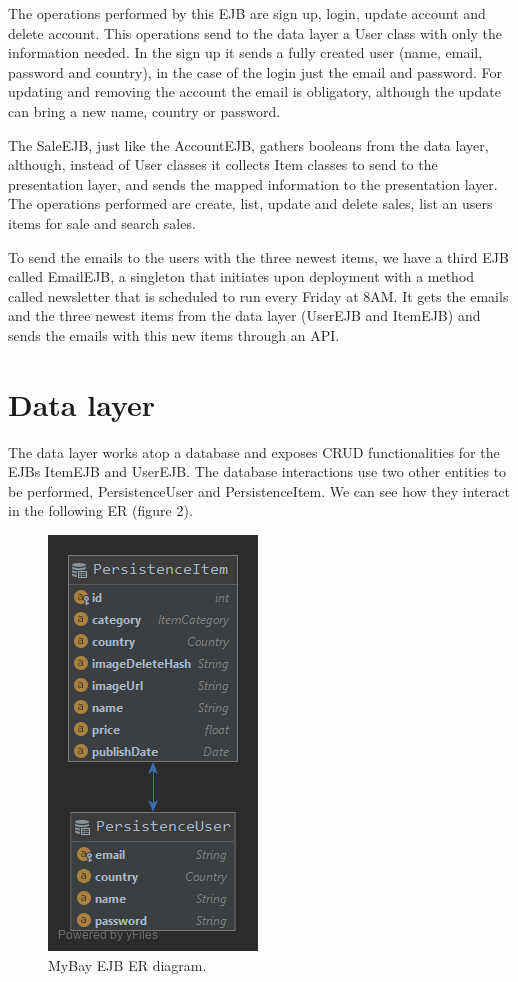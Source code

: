 \documentclass{article}
\begin{document}
\qquad The operations performed by this \ac{EJB} are sign up, login, update account and delete account. This operations send to the data layer a User class with only the information needed. In the sign up it sends a fully created user (name, email, password and country), in the case of the login just the email and password. For updating and removing the account the email is obligatory, although the update can bring a new name, country or password.

\qquad The SaleEJB, just like the AccountEJB, gathers booleans from the data layer, although, instead of User classes it collects Item classes to send to the presentation layer, and sends the mapped information to the presentation layer. The operations performed are create, list, update and delete sales, list an users items for sale and search sales. 

\qquad To send the emails to the users with the three newest items, we have a third \ac{EJB} called EmailEJB, a singleton that initiates upon deployment with a method called newsletter that is scheduled to run every Friday at 8AM. It gets the emails and the three newest items from the data layer (UserEJB and ItemEJB) and sends the emails with this new items through an API. 




\section{Data layer}

\qquad The data layer works atop a database and exposes CRUD functionalities for the \ac{EJB}s ItemEJB and UserEJB. The database interactions use two other entities to be performed, PersistenceUser and PersistenceItem.  We can see how they interact in the following \ac{ER} (figure 2).

\begin{figure}[H]
 \centering
 \includegraphics[scale=0.4]{ER_MyBay.png}
 \caption{MyBay \ac{EJB} \ac{ER} diagram.}
 \label{fig:er}
\end{figure}
\end{document}
